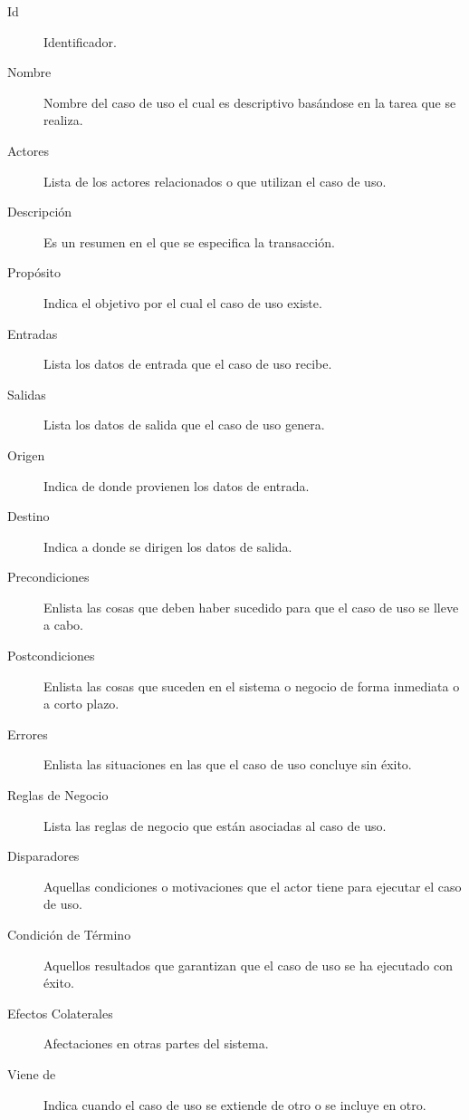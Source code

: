 \begin{description}
	\item[Id] Identificador.
	\item[Nombre] Nombre del caso de uso el cual es descriptivo basándose en la tarea que se realiza.
	\item[Actores] Lista de los actores relacionados o que utilizan el caso de uso.
	\item[Descripción] Es un resumen en el que se especifica la transacción.
	\item[Propósito] Indica el objetivo por el cual el caso de uso existe.
	\item[Entradas] Lista los datos de entrada que el caso de uso recibe.
	\item[Salidas] Lista los datos de salida que el caso de uso genera.
	\item[Origen] Indica de donde provienen los datos de entrada.
	\item[Destino] Indica a donde se dirigen los datos de salida.
	\item[Precondiciones] Enlista las cosas que deben haber sucedido para que el caso  de uso se lleve a cabo.
	\item[Postcondiciones] Enlista las cosas que suceden en el sistema o negocio de forma inmediata o a corto plazo.
	\item[Errores] Enlista las situaciones en las que el caso de uso concluye sin éxito.
	\item[Reglas de Negocio] Lista las reglas de negocio que están asociadas al caso de uso.
	\item[Disparadores] Aquellas condiciones o motivaciones que el actor tiene para ejecutar el caso de uso.
	\item[Condición de Término] Aquellos resultados que garantizan que el caso de uso se ha ejecutado con éxito.
	\item[Efectos Colaterales] Afectaciones en otras partes del sistema.
	\item[Viene de] Indica cuando el caso de uso se extiende de otro o se incluye en otro.
\end{description}

